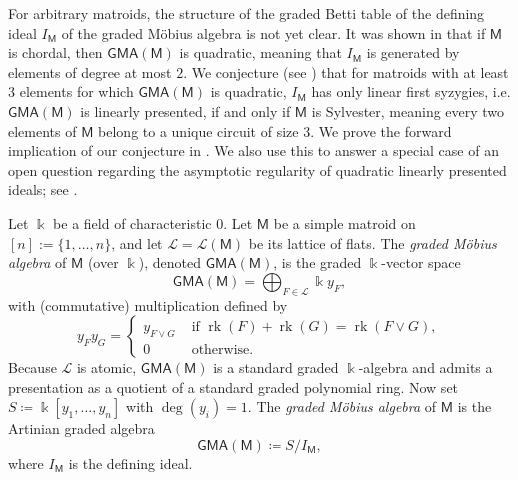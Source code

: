 
\newcommand{\newWord}[1]{\emph{#1}}
\newcommand{\KK}{\Bbbk}
\newcommand{\GMA}[1]{\mathsf{GMA}(#1)}
\newcommand{\M}{\mathsf{M}}
\newcommand{\U}{\mathsf{U}}
\DeclareMathOperator{\rk}{rk}
\newtheorem{theorem}{Theorem}[section]
\newtheorem{conjecture}[theorem]{Conjecture}
\newtheorem{proposition}[theorem]{Proposition}

For arbitrary matroids, the structure of the graded Betti table of the defining ideal $I_\M$ of the graded M\"obius algebra is not yet clear.  It was shown in \cite{LMMP24} that if $\M$ is chordal, then $\GMA{\M}$ is quadratic, meaning that $I_\M$ is generated by elements of degree at most $2$.  We conjecture (see ) that for matroids with at least 3 elements for which $\GMA{\M}$ is quadratic, $I_\M$ has only linear first syzygies, i.e. $\GMA{\M}$ is linearly presented, if and only if $\M$ is Sylvester, meaning every two elements of $\M$ belong to a unique circuit of size $3$.  We prove the forward implication of our conjecture in .  We also use this to answer a special case of an open question regarding the asymptotic regularity of quadratic linearly presented ideals; see .

 Let $\KK$ be a field of characteristic $0$.
 Let $\M$ be a simple matroid on $[n]:=\{1,\dots,n\}$, and let $\mathcal{L} = \mathcal{L}(\M)$ be its lattice of flats.  The \textit{graded M\"obius algebra} of $\M$ (over $\KK$), denoted $\GMA{\M}$, is the graded $\KK$-vector space
 \[
\GMA{\M} = \bigoplus_{F \in \mathcal{L}} \KK y_F,
 \]
 with (commutative) multiplication defined by 
 \[
y_F y_G = \begin{cases}
    y_{F \vee G} & \text{ if } \rk(F) + \rk(G) = \rk(F \vee G),\\
    0 & \text{ otherwise. }
\end{cases}
 \]
Because $\mathcal{L}$ is atomic, $\GMA{\M}$ is a standard graded $\KK$-algebra and admits a presentation as a quotient of a standard graded polynomial ring.  Now set
$S\coloneqq \KK[y_1,\dots,y_n]$ with $\deg(y_i)=1$.
The \emph{graded M\"obius algebra} of $\M$ is the Artinian graded algebra
\[
\GMA{\M}\coloneqq S/I_\M,
\]
where $I_\M$ is the defining ideal.

